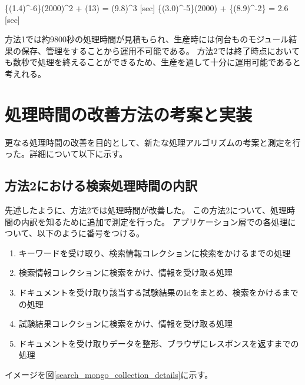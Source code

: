 \bbb
\{(1.4)^{-6}\}\times(2000)^2 + (13) = (9.8)^{3} [\rm{sec}]
\label{estimated_python_list}
\eee
\bbb
\{(3.0)^{-5}\}\times(2000) + \{(8.9)^{-2}\} = 2.6 [\rm{sec}]
\label{estimated_mongo_collection}
\eee

方法1では約9800秒の処理時間が見積もられ、生産時には何台ものモジュール結果の保存、管理をすることから運用不可能である。
方法2では終了時点においても数秒で処理を終えることができるため、生産を通して十分に運用可能であると考えれる。
 
\newpage
\section{処理時間の改善方法の考案と実装}

更なる処理時間の改善を目的として、新たな処理アルゴリズムの考案と測定を行った。詳細について以下に示す。

\subsection{方法2における検索処理時間の内訳}
先述したように、方法2では処理時間が改善した。
この方法2について、処理時間の内訳を知るために追加で測定を行った。
アプリケーション層での各処理について、以下のように番号をつける。
\begin{enumerate}
  \item キーワードを受け取り、検索情報コレクションに検索をかけるまでの処理
  \item 検索情報コレクションに検索をかけ、情報を受け取る処理
  \item ドキュメントを受け取り該当する試験結果のIdをまとめ、検索をかけるまでの処理
  \item 試験結果コレクションに検索をかけ、情報を受け取る処理
  \item ドキュメントを受け取りデータを整形、ブラウザにレスポンスを返すまでの処理
\end{enumerate}

イメージを図\ref{search_mongo_collection_details}に示す。

